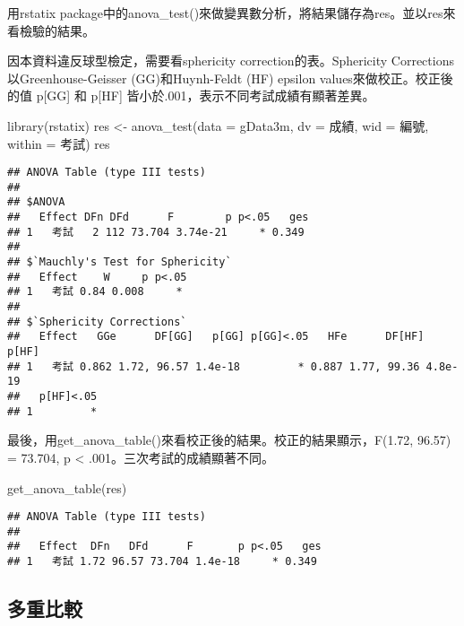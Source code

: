 \documentclass[
]{book}
\newenvironment{Shaded}{\begin{snugshade}}{\end{snugshade}}
\newcommand{\AttributeTok}[1]{\textcolor[rgb]{0.77,0.63,0.00}{#1}}
\newcommand{\FunctionTok}[1]{\textcolor[rgb]{0.00,0.00,0.00}{#1}}
\newcommand{\NormalTok}[1]{#1}
\newcommand{\OtherTok}[1]{\textcolor[rgb]{0.56,0.35,0.01}{#1}}
\begin{document}
用rstatix package中的anova\_test()來做變異數分析，將結果儲存為res。並以res來看檢驗的結果。

因本資料違反球型檢定，需要看sphericity correction的表。Sphericity Corrections以Greenhouse-Geisser (GG)和Huynh-Feldt (HF) epsilon values來做校正。校正後的值 p{[}GG{]} 和 p{[}HF{]} 皆小於.001，表示不同考試成績有顯著差異。

\begin{Shaded}
\begin{Highlighting}[]
\FunctionTok{library}\NormalTok{(rstatix)}
\NormalTok{res }\OtherTok{\textless{}{-}} \FunctionTok{anova\_test}\NormalTok{(}\AttributeTok{data =}\NormalTok{ gData3m, }\AttributeTok{dv =}\NormalTok{ 成績, }\AttributeTok{wid =}\NormalTok{ 編號, }\AttributeTok{within =}\NormalTok{ 考試)}
\NormalTok{res}
\end{Highlighting}
\end{Shaded}

\begin{verbatim}
## ANOVA Table (type III tests)
## 
## $ANOVA
##   Effect DFn DFd      F        p p<.05   ges
## 1   考試   2 112 73.704 3.74e-21     * 0.349
## 
## $`Mauchly's Test for Sphericity`
##   Effect    W     p p<.05
## 1   考試 0.84 0.008     *
## 
## $`Sphericity Corrections`
##   Effect   GGe      DF[GG]   p[GG] p[GG]<.05   HFe      DF[HF]   p[HF]
## 1   考試 0.862 1.72, 96.57 1.4e-18         * 0.887 1.77, 99.36 4.8e-19
##   p[HF]<.05
## 1         *
\end{verbatim}

最後，用get\_anova\_table()來看校正後的結果。校正的結果顯示，F(1.72, 96.57) = 73.704, p \textless{} .001。三次考試的成績顯著不同。

\begin{Shaded}
\begin{Highlighting}[]
\FunctionTok{get\_anova\_table}\NormalTok{(res)}
\end{Highlighting}
\end{Shaded}

\begin{verbatim}
## ANOVA Table (type III tests)
## 
##   Effect  DFn   DFd      F       p p<.05   ges
## 1   考試 1.72 96.57 73.704 1.4e-18     * 0.349
\end{verbatim}

\hypertarget{ux591aux91cdux6bd4ux8f03}{%
\subsection{多重比較}\label{ux591aux91cdux6bd4ux8f03}}
\end{document}
